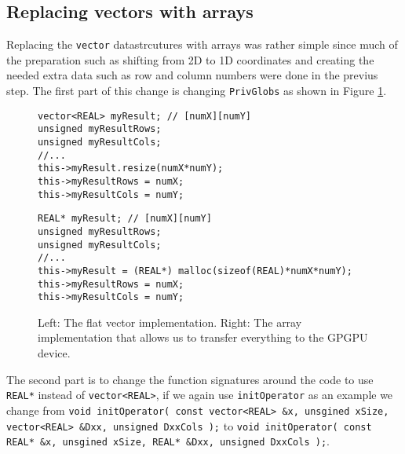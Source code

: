 \subsection{Replacing vectors with arrays}

Replacing the \texttt{vector} datastrcutures with arrays was rather simple since
much of the preparation such as shifting from 2D to 1D coordinates and creating
the needed extra data such as row and column numbers were done in the previus
step. The first part of this change is changing \texttt{PrivGlobs} as shown in
Figure \ref{code:privglobsv2a}.

\begin{figure}[H]
    \begin{minipage}{.45\textwidth}
        \begin{lstlisting}
vector<REAL> myResult; // [numX][numY]
unsigned myResultRows;
unsigned myResultCols;
//...
this->myResult.resize(numX*numY);
this->myResultRows = numX;
this->myResultCols = numY;
        \end{lstlisting}
    \end{minipage}\hfill
    \begin{minipage}{.45\textwidth}
        \begin{lstlisting}
REAL* myResult; // [numX][numY]
unsigned myResultRows;
unsigned myResultCols;
//...
this->myResult = (REAL*) malloc(sizeof(REAL)*numX*numY);
this->myResultRows = numX;
this->myResultCols = numY;
        \end{lstlisting}
    \end{minipage}
    \caption{Left: The flat vector implementation. Right: The array
    implementation that allows us to transfer everything to the GPGPU device.}
    \label{code:privglobsv2a}
\end{figure}

The second part is to change the function signatures around the code to use
\texttt{REAL*} instead of \texttt{vector<REAL>}, if we again use
\texttt{initOperator} as an example we change from \texttt{void initOperator(
const vector<REAL> \&x, unsgined xSize, vector<REAL> \&Dxx, unsigned DxxCols );}
to \texttt{void initOperator(  const REAL* \&x, unsgined xSize, REAL* \&Dxx,
unsigned DxxCols );}.